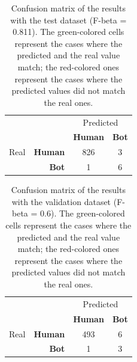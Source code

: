 \documentclass[a4paper, 12pt]{book}
\begin{document}
\begin{table}[tb]
\renewcommand{\arraystretch}{1.5}
\begin{center}
\begin{tabular}{ l r c c }
\toprule
      &                & \multicolumn{2}{c}{Predicted} \tabularnewline
      &                & \textbf{Human}              & \textbf{Bot} \\
                         
 Real & \textbf{Human} & \cellcolor[HTML]{67FD9A}826 & \cellcolor[HTML]{FD6864}3 \\ %
      & \textbf{Bot}   & \cellcolor[HTML]{FD6864}1   & \cellcolor[HTML]{67FD9A}6  \\ %
\bottomrule
\end{tabular}
\caption{Confusion matrix of the results with the test dataset (F-beta = 0.811). The green-colored cells represent the cases where the predicted and the real value match; the red-colored ones represent the cases where the predicted values did not match the real ones.}
\label{table:confusion-matrix-test}
\end{center}
\end{table}

\begin{table}[tb]
\renewcommand{\arraystretch}{1.5}
\begin{center}
\begin{tabular}{ l r c c }
\toprule
      &                & \multicolumn{2}{c}{Predicted} \tabularnewline
      &                & \textbf{Human}              & \textbf{Bot} \\
                         
 Real & \textbf{Human} & \cellcolor[HTML]{67FD9A}493 & \cellcolor[HTML]{FD6864}6 \\ %
      & \textbf{Bot}   & \cellcolor[HTML]{FD6864}1   & \cellcolor[HTML]{67FD9A}3  \\ %
\bottomrule
\end{tabular}
\caption{Confusion matrix of the results with the validation dataset (F-beta = 0.6). The green-colored cells represent the cases where the predicted and the real value match; the red-colored ones represent the cases where the predicted values did not match the real ones.}
\label{table:confusion-matrix-val}
\end{center}
\end{table}
\end{document}
